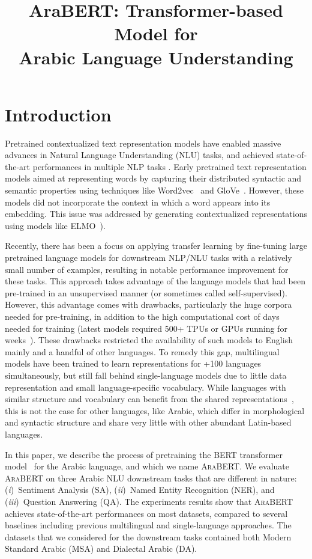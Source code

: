 \documentclass[10pt, a4paper]{article}
\title{AraBERT: Transformer-based Model for\\Arabic Language Understanding}
\newcommand{\Ni}{({\em i})~}
\newcommand{\Nii}{({\em ii})~}
\newcommand{\Niii}{({\em iii})~}
\begin{document}
\maketitleabstract
\section{Introduction}
Pretrained contextualized text representation models have enabled massive advances in Natural Language Understanding (NLU) tasks, and achieved state-of-the-art performances in multiple NLP tasks \cite{howard2018universal,devlin2018bert}.  Early pretrained text representation models aimed at representing words by capturing their distributed syntactic and semantic properties using techniques like Word2vec~\cite{mikolov2013distributed} and GloVe~\cite{pennington2014glove}.  However, these models did not incorporate the context in which a word appears into its embedding.  This issue was addressed by generating contextualized representations using models like ELMO~\cite{peters2018deep}).

Recently, there has been a focus on applying transfer learning by fine-tuning large pretrained language models for downstream NLP/NLU tasks with a relatively small number of examples, resulting in notable performance improvement for these tasks.
This approach takes advantage of the language models that had been pre-trained in an unsupervised manner (or sometimes called self-supervised). However, this advantage comes with drawbacks, particularly the huge corpora needed for pre-training, in addition to the high computational cost of days needed for training (latest models required 500+ TPUs or GPUs running for weeks~\cite{conneau2019unsupervised,raffel2019exploring,adiwardana2020humanlike}).  These drawbacks restricted the availability of such models to English mainly and a handful of other languages.  To remedy this gap, multilingual models have been trained to learn representations for +100 languages simultaneously, but still fall behind single-language models due to little data representation and small language-specific vocabulary.  While languages with similar structure and vocabulary can benefit from the shared representations~\cite{conneau2019unsupervised}, this is not the case for other languages, like Arabic, which differ in morphological and syntactic structure and share very little with other abundant Latin-based languages. 

In this paper, we describe the process of pretraining the BERT transformer model~\cite{devlin2018bert} for the Arabic language, and which we name \textsc{AraBERT}.  We evaluate \textsc{AraBERT} on three Arabic NLU downstream tasks that are different in nature: \Ni Sentiment Analysis (SA), \Nii Named Entity Recognition (NER), and \Niii Question Answering (QA).  The experiments results show that \textsc{AraBERT} achieves state-of-the-art performances on most datasets, compared to several baselines including previous multilingual and single-language approaches.  The datasets that we considered for the downstream tasks contained both Modern Standard Arabic (MSA) and Dialectal Arabic (DA).
\end{document}

